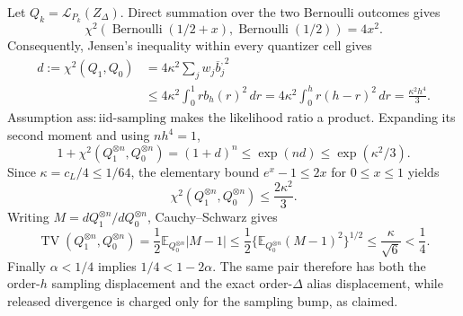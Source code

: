 Let \(Q_k=\mathcal L_{P_k}(Z_\Delta)\).  Direct summation over the two Bernoulli outcomes gives
\[
 \chi^2\!\left(\operatorname{Bernoulli}(1/2+x),
                    \operatorname{Bernoulli}(1/2)\right)=4x^2.
\]
Consequently, Jensen's inequality within every quantizer cell gives
\[
 \begin{aligned}
 d:=\chi^2(Q_1,Q_0)
 &=4\kappa^2\sum_jw_j\overline b_j^{,2}\\
 &\leq4\kappa^2\int_0^1rb_h(r)^2\,dr
 =4\kappa^2\int_0^h r(h-r)^2\,dr
 =\frac{\kappa^2h^4}{3}.
 \end{aligned}
\]
Assumption \(\mathrm{ass:iid\text{-}sampling}\) makes the likelihood ratio a product.  Expanding its second moment and using \(nh^4=1\),
\[
 1+\chi^2(Q_1^{\otimes n},Q_0^{\otimes n})
 =(1+d)^n
 \leq\exp(nd)
 \leq\exp(\kappa^2/3).
\]
Since \(\kappa=c_L/4\leq1/64\), the elementary bound \(e^x-1\leq2x\) for \(0\leq x\leq1\) yields
\[
 \chi^2(Q_1^{\otimes n},Q_0^{\otimes n})
 \leq\frac{2\kappa^2}{3}.
\]
Writing \(M=dQ_1^{\otimes n}/dQ_0^{\otimes n}\), Cauchy--Schwarz gives
\[
 \operatorname{TV}(Q_1^{\otimes n},Q_0^{\otimes n})
 =\frac12\mathbb E_{Q_0^{\otimes n}}|M-1|
 \leq\frac12\{\mathbb E_{Q_0^{\otimes n}}(M-1)^2\}^{1/2}
 \leq\frac{\kappa}{\sqrt6}<\frac14.
\]
Finally \(\alpha<1/4\) implies \(1/4<1-2\alpha\).  The same pair therefore has both the order-\(h\) sampling displacement and the exact order-\(\Delta\) alias displacement, while released divergence is charged only for the sampling bump, as claimed.
